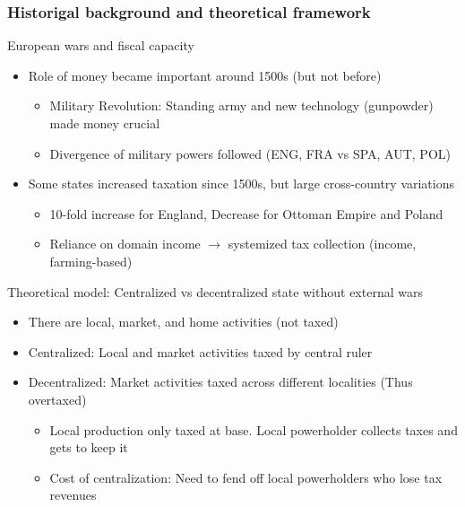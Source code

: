 \documentclass[aspectratio=169]{beamer}
\begin{document}
\begin{frame}
\frametitle{Historigal background and theoretical framework} 
European wars and fiscal capacity
\begin{itemize}\setlength\itemsep{3pt}
\item Role of money became important around 1500s (but not before)
\begin{itemize}\setlength\itemsep{3pt}
\item Military Revolution: Standing army and new technology (gunpowder) made money crucial
\item Divergence of military powers followed (ENG, FRA vs SPA, AUT, POL)
\end{itemize}
\item Some states increased taxation since 1500s, but large cross-country variations
\begin{itemize}\setlength\itemsep{3pt}
  \item 10-fold increase for England, Decrease for Ottoman Empire and Poland
  \item Reliance on domain income $\to$ systemized tax collection (income, farming-based)
\end{itemize}\medskip
\end{itemize}\medskip
Theoretical model: Centralized vs decentralized state without external wars
\begin{itemize}\setlength\itemsep{3pt}
  \item There are local, market, and home activities (not taxed)
  \item Centralized: Local and market activities taxed by central ruler
  \item Decentralized: Market activities taxed across different localities (Thus overtaxed)
  \begin{itemize}\setlength\itemsep{3pt}
  \item Local production only taxed at base. Local powerholder collects taxes and gets to keep it
  \item Cost of centralization: Need to fend off local powerholders who lose tax revenues
\end{itemize}\medskip
\end{itemize}
\end{frame}
\end{document}
